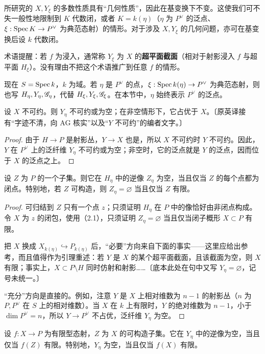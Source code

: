 所研究的 $X,Y_\xi$ 的多数性质具有“几何性质”，因此在基变换下不变。这使我们可不失一般性地限制到 $K$ 代数闭，或者 $K=k(\eta)$（$\eta$ 为 $P^\vee$ 的泛点、$\xi:\operatorname{Spec} K\to P^\vee$ 为典范态射）的情形。对于涉及 $X,Y_\xi$ 的几何问题，亦可在基变换后设 $k$ 代数闭。

术语提醒：若 $f$ 为浸入，通常称 $Y_\xi$ 为 $X$ 的\textbf{超平面截面}（相对于射影浸入 $f$ 与超平面 $H_\xi$）。没有理由不把这个术语推广到任意 $f$ 的情形。

现在 $S=\operatorname{Spec} k$，$k$ 为域。若 $\eta$ 是 $P^\vee$ 的点，$\xi:\operatorname{Spec} k(\eta)\to P^\vee$ 为典范态射，则也写 $H_\eta,Y_\eta,\mathscr G_\eta$，代替 $H_\xi,Y_\xi,\mathscr G_\xi$。在本节中，$\eta$ 始终表示 $P^\vee$ 的泛点。

设 $X$ 不可约。则 $Y_\eta$ 不可约或为空；在非空情形下，它占优于 $X$。〔原英译接有“字迹不清，向 AG 核实”以及“$Y$ 不可约”的编者文字。〕
\begin{proof}
由于 $H\to P$ 是射影丛，$Y\to X$ 也是，所以 $X$ 不可约时 $Y$ 不可约。因此，$Y$ 在 $P^\vee$ 上的泛纤维 $Y_\eta$ 不可约或为空；非空时，它的泛点就是 $Y$ 的泛点，因而位于 $X$ 的泛点之上。
\end{proof}

设 $Z$ 为 $P$ 的一个子集。则它在 $H_\eta$ 中的逆像 $Z_\eta$ 为空，当且仅当 $Z$ 的每个点都为闭点。特别地，若 $Z$ 可构造，则 $Z_\eta=\varnothing$ 当且仅当 $Z$ 有限。
\begin{proof}
可归结到 $Z$ 只有一个点 $z$；只须证明 $H_\eta$ 在 $P$ 中的像恰好由非闭点构成。令 $X$ 为 $z$ 的闭包，使用（2.1），只须证明 $Z_\eta=\varnothing$ 当且仅当闭子概形 $X\subset P$ 有限。

把 $X$ 换成 $X_{k(\eta)}\hookrightarrow P_{k(\eta)}$ 后，“必要”方向来自下面的事实——这里应给出参考，而且值得作为引理重述：若 $Y$ 是 $X$ 的某个超平面截面，且该截面为空，则 $X$ 有限；事实上，$X\subset P\setminus H$ 同时仿射和射影……〔底本此处在句中又写 $Y_\eta=\varnothing$，记号未统一。〕

“充分”方向是直接的。例如，注意 $Y$ 是 $X$ 上相对维数为 $n-1$ 的射影丛（$n$ 为 $P,P^\vee$ 在 $S$ 上的相对维数）。当 $X$ 在 $k$ 上有限时，$Y$ 的绝对维数为 $n-1$，小于 $\dim P^\vee=n$，所以 $Y\to P^\vee$ 不占优，泛纤维 $Y_\eta$ 为空。
\end{proof}

设 $f:X\to P$ 为有限型态射，$Z$ 为 $X$ 的可构造子集。它在 $Y_\eta$ 中的逆像为空，当且仅当 $f(Z)$ 有限。特别地，$Y_\eta$ 为空，当且仅当 $f(X)$ 有限。

